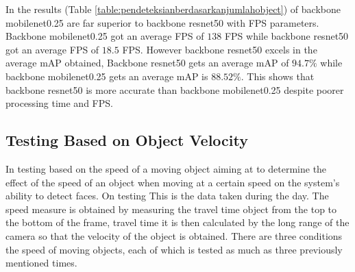 In the results (Table \ref{table:pendeteksianberdasarkanjumlahobject}) of backbone mobilenet0.25 are far superior to backbone resnet50
with FPS parameters. Backbone mobilenet0.25 got an average FPS of $138$ FPS while backbone resnet50 got an average FPS of $18.5$ FPS. However 
backbone resnet50 excels in the average mAP obtained, Backbone resnet50 gets an average mAP of $94.7\%$ while backbone mobilenet0.25 gets an average
mAP is $88.52\%$. This shows that backbone resnet50 is more accurate than backbone mobilenet0.25 despite poorer processing time and FPS.

\subsection{Testing Based on Object Velocity}

In testing based on the speed of a moving object aiming at
to determine the effect of the speed of an object when moving at a certain speed on
the system's ability to detect faces. On testing
This is the data taken during the day.
The speed measure is obtained by measuring the travel time
object from the top to the bottom of the frame, travel time
it is then calculated by the long range of the camera
so that the velocity of the object \citep{nugrohoevalution2016} is obtained. There are three conditions
the speed of moving objects, each of which is tested as much as three
previously mentioned times.


